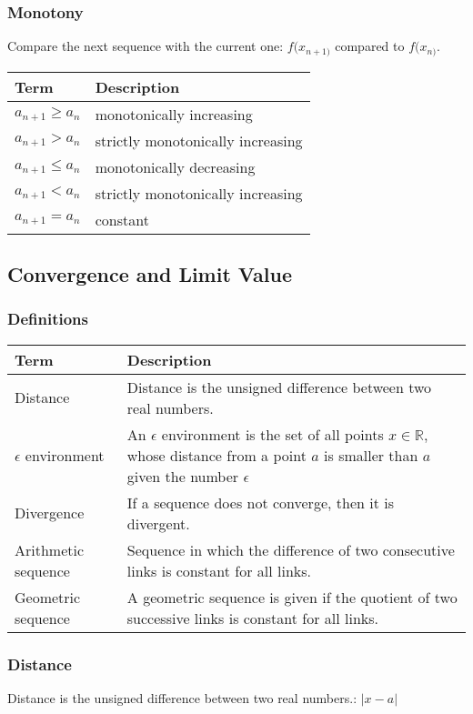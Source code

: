 \documentclass{book}
\begin{document}
\subsubsection{Monotony}
Compare the next sequence with the current one: $f(x_{n+1)}$ compared to $f(x_{n)}$.

\begin{tabular}{lp{10.5cm}}
  \toprule
  \textbf{Term} & \textbf{Description} \\
  \midrule
  $a_{n+1} \geq a_{n}$    & monotonically increasing\\
  \midrule
  $a_{n+1} > a_{n}$    & strictly monotonically increasing\\
  \midrule
  $a_{n+1} \leq a_{n}$    & monotonically decreasing\\
  \midrule
  $a_{n+1} < a_{n}$    & strictly monotonically increasing\\
  \midrule
  $a_{n+1} = a_{n}$    & constant\\
  \bottomrule
\end{tabular}


\subsection{Convergence and Limit Value}
\subsubsection{Definitions}
\begin{tabular}{p{3cm}p{10.5cm}}
  \toprule
  \textbf{Term} & \textbf{Description} \\
  \midrule
  Distance & Distance is the unsigned difference between two real numbers.\\
  \midrule
  $\epsilon$ environment & An $\epsilon$ environment is the set of all points $x\in\mathbb{R}$, whose distance from a point $a$ is smaller than $a$ given the number $\epsilon$\\
  \midrule
  Divergence & If a sequence does not converge, then it is divergent.\\
  \midrule
  Arithmetic sequence & Sequence in which the difference of two consecutive links is constant for all links.\\
  \midrule
  Geometric sequence & A geometric sequence is given if the quotient of two successive links is constant for all links.\\ 
  \bottomrule
\end{tabular}
\subsubsection{Distance}
Distance is the unsigned difference between two real numbers.: $|x-a|$
\end{document}
